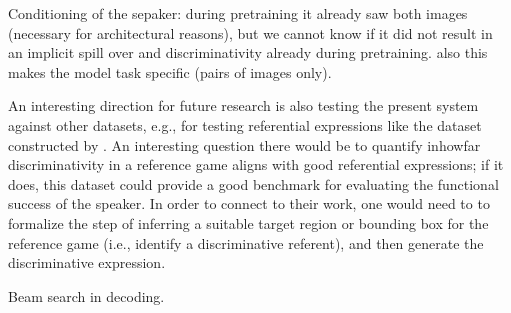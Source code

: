 Conditioning of the sepaker: during pretraining it already saw both images (necessary for architectural reasons), but we cannot know if it did not result in an implicit spill over and discriminativity already during pretraining. also this makes the model task specific (pairs of images only). 

An interesting direction for future research is also testing the present system against other datasets, e.g., for testing referential expressions like the dataset constructed by \cite{mao2016generation}. An interesting question there would be to quantify inhowfar discriminativity in a reference game aligns with good referential expressions; if it does, this dataset could provide a good benchmark for evaluating the functional success of the speaker. In order to connect to their work, one would need to to formalize the step of inferring a suitable target region or bounding box for the reference game (i.e., identify a discriminative referent), and then generate the discriminative expression. 

Beam search in decoding.
